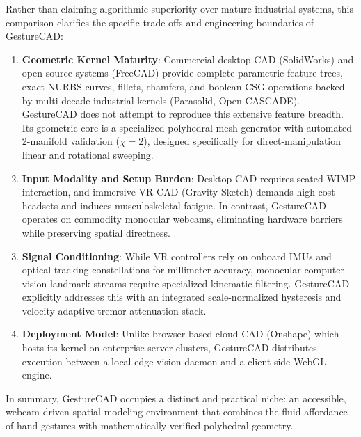 Rather than claiming algorithmic superiority over mature industrial systems, this comparison clarifies the specific trade-offs and engineering boundaries of GestureCAD:
\begin{enumerate}
    \item \textbf{Geometric Kernel Maturity}: Commercial desktop CAD (SolidWorks) and open-source systems (FreeCAD) provide complete parametric feature trees, exact NURBS curves, fillets, chamfers, and boolean CSG operations backed by multi-decade industrial kernels (Parasolid, Open CASCADE). GestureCAD does not attempt to reproduce this extensive feature breadth. Its geometric core is a specialized polyhedral mesh generator with automated 2-manifold validation ($\chi = 2$), designed specifically for direct-manipulation linear and rotational sweeping.
    \item \textbf{Input Modality and Setup Burden}: Desktop CAD requires seated WIMP interaction, and immersive VR CAD (Gravity Sketch) demands high-cost headsets and induces musculoskeletal fatigue. In contrast, GestureCAD operates on commodity monocular webcams, eliminating hardware barriers while preserving spatial directness.
    \item \textbf{Signal Conditioning}: While VR controllers rely on onboard IMUs and optical tracking constellations for millimeter accuracy, monocular computer vision landmark streams require specialized kinematic filtering. GestureCAD explicitly addresses this with an integrated scale-normalized hysteresis and velocity-adaptive tremor attenuation stack.
    \item \textbf{Deployment Model}: Unlike browser-based cloud CAD (Onshape) which hosts its kernel on enterprise server clusters, GestureCAD distributes execution between a local edge vision daemon and a client-side WebGL engine.
\end{enumerate}
In summary, GestureCAD occupies a distinct and practical niche: an accessible, webcam-driven spatial modeling environment that combines the fluid affordance of hand gestures with mathematically verified polyhedral geometry.
